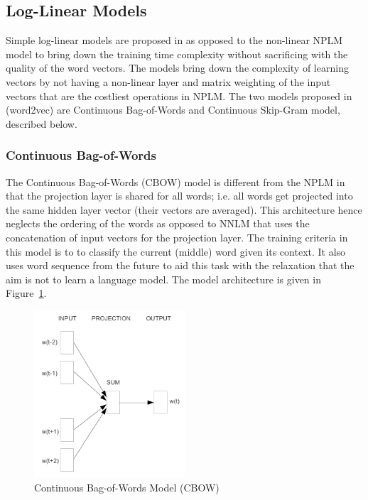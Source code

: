 \subsection{Log-Linear Models}
\label{sec:word2vec}
Simple log-linear models are proposed in \cite{mikolov2013efficient} as opposed to the non-linear NPLM model to bring down the training time complexity without sacrificing with the quality of the word vectors.  The models bring down the complexity of learning vectors by not having a non-linear layer and matrix weighting of the input vectors that are the costliest operations in NPLM. The two models proposed in \cite{mikolov2013efficient} (word2vec) are Continuous Bag-of-Words and Continuous Skip-Gram model, described below.

\subsubsection{Continuous Bag-of-Words}
\label{sec:cbow}
The Continuous Bag-of-Words (CBOW) model is different from the NPLM in that the projection layer is shared for all words; i.e. all words get projected into the same hidden layer vector (their vectors are averaged). This architecture hence neglects the ordering of the words as opposed to NNLM that uses the concatenation of input vectors for the projection layer. The training criteria in this model is to to classify the current (middle) word given its context. It also uses word sequence from the future to aid this task with the relaxation that the aim is not to learn a language model. The model architecture is given in Figure~\ref{fig:nn:cbow}.
\begin{figure}[h!]
    \centering
        \includegraphics[width=0.5\textwidth]{figs/mikolov_cbow.png}
    \caption{Continuous Bag-of-Words Model (CBOW) }
    \label{fig:nn:cbow}
\end{figure}
